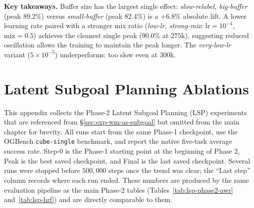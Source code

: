 \begin{table}[h]
\medskip
\noindent\textbf{Key takeaways.} Buffer size has the largest single
effect: \emph{slow-relabel, big-buffer} (peak $89.2\%$) versus
\emph{small-buffer} (peak $82.4\%$) is a $+6.8\%$ absolute lift. A
lower learning rate paired with a stronger mix ratio
(\emph{low-lr, strong-mix}: $\mathrm{lr}=10^{-4}$, $\mathrm{mix}=0.5$)
achieves the cleanest single peak ($90.0\%$ at $275$k), suggesting
reduced oscillation allows the training to maintain the peak longer.
The \emph{very-low-lr} variant ($5\times 10^{-5}$) underperforms: too
slow even at $300$k.
\end{table}


\chapter{Latent Subgoal Planning Ablations}
\label{app:lsp-ablations}

This appendix collects the Phase-2 Latent Subgoal Planning (LSP)
experiments that are referenced from \S\ref{sec:exp-wm-as-subgoal} but
omitted from the main chapter for brevity. All runs start from the same
Phase-1 checkpoint, use the OGBench \texttt{cube-single} benchmark, and
report the native five-task average success rate. Step-0 is the
Phase-1 starting point at the beginning of Phase 2, Peak is the best
saved checkpoint, and Final is the last saved checkpoint. Several runs
were stopped before $500{,}000$ steps once the trend was clear; the
``Last step'' column records where each run ended. These numbers are
produced by the same evaluation pipeline as the main Phase-2 tables
(Tables~\ref{tab:lsp-phase2-awr} and~\ref{tab:lsp-hrf}) and are directly
comparable to them.

